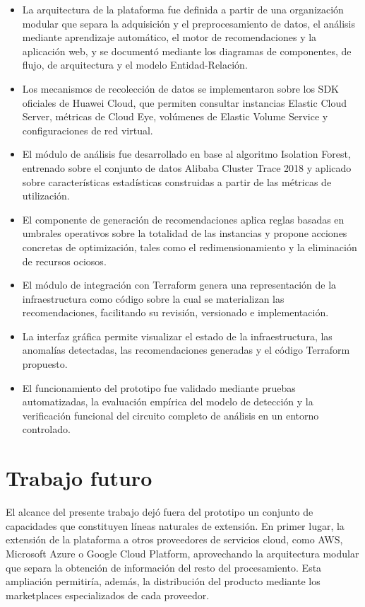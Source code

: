 \begin{itemize}
\item La arquitectura de la plataforma fue definida a partir de una organización modular que separa la adquisición y el preprocesamiento de datos, el análisis mediante aprendizaje automático, el motor de recomendaciones y la aplicación web, y se documentó mediante los diagramas de componentes, de flujo, de arquitectura y el modelo Entidad-Relación.
\item Los mecanismos de recolección de datos se implementaron sobre los SDK oficiales de Huawei Cloud, que permiten consultar instancias Elastic Cloud Server, métricas de Cloud Eye, volúmenes de Elastic Volume Service y configuraciones de red virtual.
\item El módulo de análisis fue desarrollado en base al algoritmo Isolation Forest, entrenado sobre el conjunto de datos Alibaba Cluster Trace 2018 y aplicado sobre características estadísticas construidas a partir de las métricas de utilización.
\item El componente de generación de recomendaciones aplica reglas basadas en umbrales operativos sobre la totalidad de las instancias y propone acciones concretas de optimización, tales como el redimensionamiento y la eliminación de recursos ociosos.
\item El módulo de integración con Terraform genera una representación de la infraestructura como código sobre la cual se materializan las recomendaciones, facilitando su revisión, versionado e implementación.
\item La interfaz gráfica permite visualizar el estado de la infraestructura, las anomalías detectadas, las recomendaciones generadas y el código Terraform propuesto.
\item El funcionamiento del prototipo fue validado mediante pruebas automatizadas, la evaluación empírica del modelo de detección y la verificación funcional del circuito completo de análisis en un entorno controlado.
\end{itemize}

\section{Trabajo futuro}

El alcance del presente trabajo dejó fuera del prototipo un conjunto de capacidades que constituyen líneas naturales de extensión. En primer lugar, la extensión de la plataforma a otros proveedores de servicios cloud, como AWS, Microsoft Azure o Google Cloud Platform, aprovechando la arquitectura modular que separa la obtención de información del resto del procesamiento. Esta ampliación permitiría, además, la distribución del producto mediante los marketplaces especializados de cada proveedor.

